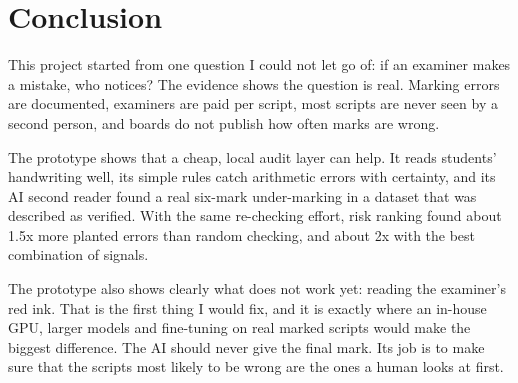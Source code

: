 \chapter{Conclusion}
\label{sec:conclusion}
This project started from one question I could not let go of: if an examiner makes a mistake, who notices? The evidence
shows the question is real. Marking errors are documented, examiners are paid per script, most scripts are never seen by
a second person, and boards do not publish how often marks are wrong.

The prototype shows that a cheap, local audit layer can help. It reads students' handwriting well, its simple rules
catch arithmetic errors with certainty, and its AI second reader found a real six-mark under-marking in a dataset that
was described as verified. With the same re-checking effort, risk ranking found about 1.5x more planted errors than random
checking, and about 2x with the best combination of signals.

The prototype also shows clearly what does not work yet: reading the examiner's red ink. That is the first thing I would
fix, and it is exactly where an in-house GPU, larger models and fine-tuning on real marked scripts would make the biggest
difference. The AI should never give the final mark. Its job is to make sure that the scripts most likely to be wrong are
the ones a human looks at first.
